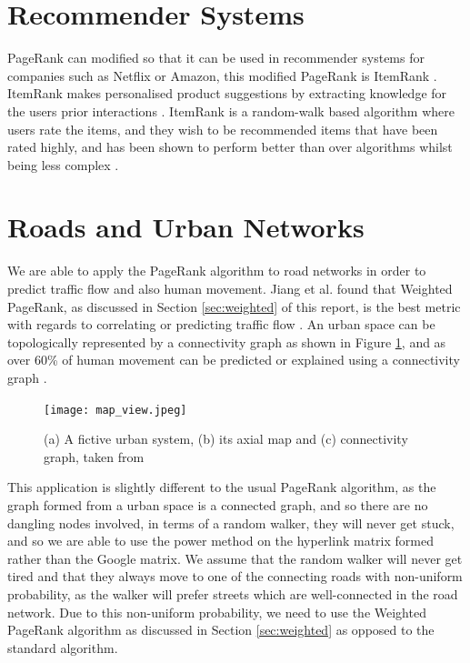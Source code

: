 \documentclass[11pt]{report}
\begin{document}
{\section{Recommender Systems} \label{sec:recommender}
PageRank can modified so that it can be used in recommender systems for companies such as Netflix or Amazon, this modified PageRank is ItemRank \cite{gleich2015pagerank}. ItemRank makes personalised product suggestions by extracting knowledge for the users prior interactions \cite{gori2007itemrank}. ItemRank is a random-walk based algorithm where users rate the items, and they wish to be recommended items that have been rated highly, and has been shown to perform better than over algorithms whilst being less complex \cite{gori2007itemrank}.

\section{Roads and Urban Networks} \label{sec:Roads}
We are able to apply the PageRank algorithm to road networks in order to predict traffic flow and also human movement. Jiang et al. found that Weighted PageRank, as discussed in Section \ref{sec:weighted} of this report, is the best metric with regards to correlating or predicting traffic flow \cite{1742-5468-2008-07-P07008}. An urban space can be topologically represented by a connectivity graph as shown in Figure \ref{fig:city rep}, and as over 60\% of human movement can be predicted or explained using a connectivity graph \cite{doi:10.1080/13658810802022822}.

\begin{figure}[h!]
\centering
\texttt{[image: map\_view.jpeg]}
\caption{(a) A fictive urban system, (b) its axial map and (c) connectivity graph, taken from \cite{doi:10.1080/13658810802022822}}
\label{fig:city rep}
\end{figure}

This application is slightly different to the usual PageRank algorithm, as the graph formed from a urban space is a connected graph, and so there are no dangling nodes involved, in terms of a random walker, they will never get stuck, and so we are able to use the power method on the hyperlink matrix formed rather than the Google matrix. We assume that the random walker will never get tired and that they always move to one of the connecting roads with non-uniform probability, as the walker will prefer streets which are well-connected in the road network. Due to this non-uniform probability, we need to use the Weighted PageRank algorithm as discussed in Section \ref{sec:weighted} as opposed to the standard algorithm.

}
\end{document}
